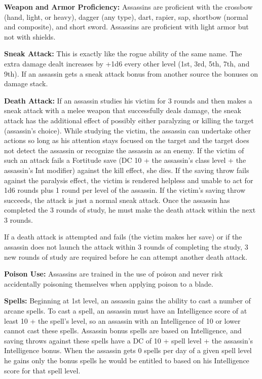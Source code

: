 {
\textbf{Weapon and Armor Proficiency:} Assassins are proficient with the crossbow (hand, light, or heavy), dagger (any type), dart, rapier, sap, shortbow (normal and composite), and short sword. Assassins are proficient with light armor but not with shields.

\textbf{Sneak Attack:} This is exactly like the rogue ability of the same name. The extra damage dealt increases by +1d6 every other level (1st, 3rd, 5th, 7th, and 9th). If an assassin gets a sneak attack bonus from another source the bonuses on damage stack.

\textbf{Death Attack:} If an assassin studies his victim for 3 rounds and then makes a sneak attack with a melee weapon that successfully deals damage, the sneak attack has the additional effect of possibly either paralyzing or killing the target (assassin's choice). While studying the victim, the assassin can undertake other actions so long as his attention stays focused on the target and the target does not detect the assassin or recognize the assassin as an enemy. If the victim of such an attack fails a Fortitude save (DC 10 + the assassin's class level + the assassin's Int modifier) against the kill effect, she dies. If the saving throw fails against the paralysis effect, the victim is rendered helpless and unable to act for 1d6 rounds plus 1 round per level of the assassin. If the victim's saving throw succeeds, the attack is just a normal sneak attack. Once the assassin has completed the 3 rounds of study, he must make the death attack within the next 3 rounds.

If a death attack is attempted and fails (the victim makes her save) or if the assassin does not launch the attack within 3 rounds of completing the study, 3 new rounds of study are required before he can attempt another death attack.

\textbf{Poison Use:} Assassins are trained in the use of poison and never risk accidentally poisoning themselves when applying poison to a blade.

\textbf{Spells:} Beginning at 1st level, an assassin gains the ability to cast a number of arcane spells. To cast a spell, an assassin must have an Intelligence score of at least 10 + the spell's level, so an assassin with an Intelligence of 10 or lower cannot cast these spells. Assassin bonus spells are based on Intelligence, and saving throws against these spells have a DC of 10 + spell level + the assassin's Intelligence bonus. When the assassin gets 0 spells per day of a given spell level he gains only the bonus spells he would be entitled to based on his Intelligence score for that spell level.

}
